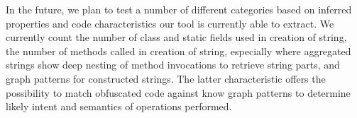 
In the future, we plan to test a number of different categories based on
inferred properties and code characteristics our tool is currently able to extract. 
We currently  count the number of class and
static fields used in creation of string, the number of methods called in
creation of string, especially where aggregated strings show deep nesting of
method invocations to retrieve string parts, and graph patterns for constructed
strings. The latter characteristic offers the possibility to match obfuscated
code against know graph patterns to determine likely intent and semantics of
operations performed.


  


